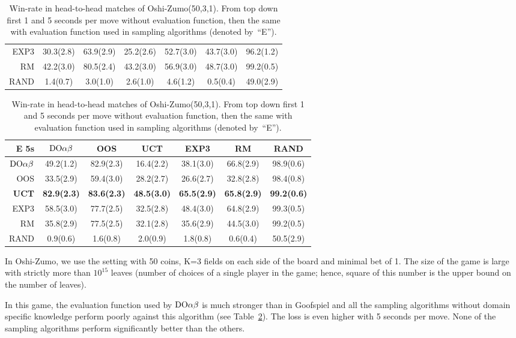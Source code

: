 \begin{table}[t!]
\begin{scriptsize}
\begin{tabular}{|r|cccccc|}
EXP3&30.3(2.8)&63.9(2.9)&25.2(2.6)&52.7(3.0)&43.7(3.0)&96.2(1.2)\\
RM&42.2(3.0)&80.5(2.4)&43.2(3.0)&56.9(3.0)&48.7(3.0)&99.2(0.5)\\
RAND&1.4(0.7)&3.0(1.0)&2.6(1.0)&4.6(1.2)&0.5(0.4)&49.0(2.9)\\
\hline
\end{tabular}
\begin{tabular}{|r|cccccc|}\hline
E 5s&$\textrm{DO}\alpha\beta$&OOS&UCT&EXP3&RM&RAND\\\hline
$\textrm{DO}\alpha\beta$&49.2(1.2)&82.9(2.3)&16.4(2.2)&38.1(3.0)&66.8(2.9)&98.9(0.6)\\
OOS&33.5(2.9)&59.4(3.0)&28.2(2.7)&26.6(2.7)&32.8(2.8)&98.4(0.8)\\
\textbf{UCT}&\textbf{82.9(2.3)}&\textbf{83.6(2.3)}&\textbf{48.5(3.0)}&\textbf{65.5(2.9)}&\textbf{65.8(2.9)}&\textbf{99.2(0.6)}\\
EXP3&58.5(3.0)&77.7(2.5)&32.5(2.8)&48.4(3.0)&64.8(2.9)&99.3(0.5)\\
RM&35.8(2.9)&77.5(2.5)&32.1(2.8)&35.6(2.9)&44.5(3.0)&99.2(0.5)\\
RAND&0.9(0.6)&1.6(0.8)&2.0(0.9)&1.8(0.8)&0.6(0.4)&50.5(2.9)\\
\hline
\end{tabular}

\end{scriptsize}
\caption{Win-rate in head-to-head matches of Oshi-Zumo(50,3,1). From top down first 1 and 5 seconds per move without evaluation function, then the same with evaluation function used in sampling algorithms (denoted by~``E'').}\label{fig:matches:oz}
\end{table}

In Oshi-Zumo, we use the setting with 50 coins, K=3 fields on each side of the board and minimal bet of 1. 
The size of the game is large with strictly more than $10^{15}$ leaves (number of choices of a single player in the game; hence, square of this number is the upper bound on the number of leaves).

In this game, the evaluation function used by $\textrm{DO}\alpha\beta$ is much stronger than in Goofspiel and all the sampling algorithms without domain specific knowledge perform poorly against this algorithm (see Table~\ref{fig:matches:oz}). The loss is even higher with 5 seconds per move. None of the sampling algorithms perform significantly better than the others.


